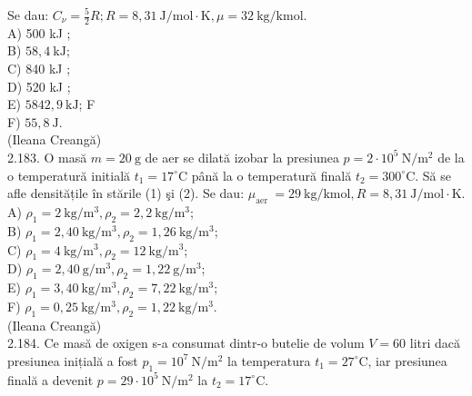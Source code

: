 \documentclass[10pt]{article}
\begin{document}
Se dau: $C_{\nu}=\frac{5}{2} R ; R=8,31 \mathrm{~J} / \mathrm{mol} \cdot \mathrm{K}, \mu=32 \mathrm{~kg} / \mathrm{kmol}$.\\
A) 500 kJ ;\\
B) $58,4 \mathrm{~kJ}$;\\
C) 840 kJ ;\\
D) 520 kJ ;\\
E) $5842,9 \mathrm{~kJ}$; F\\
F) $55,8 \mathrm{~J}$.\\
(Ileana Creangă)\\
2.183. O masă $m=20 \mathrm{~g}$ de aer se dilată izobar la presiunea $p=2 \cdot 10^{5} \mathrm{~N} / \mathrm{m}^{2}$ de la o temperatură initială $t_{1}=17^{\circ} \mathrm{C}$ până la o temperatură finală $t_{2}=300^{\circ} \mathrm{C}$. Să se afle densitățile în stările (1) şi (2). Se dau: $\mu_{\text {aer }}=29 \mathrm{~kg} / \mathrm{kmol}, R=8,31 \mathrm{~J} / \mathrm{mol} \cdot \mathrm{K}$.\\
A) $\rho_{1}=2 \mathrm{~kg} / \mathrm{m}^{3}, \rho_{2}=2,2 \mathrm{~kg} / \mathrm{m}^{3}$;\\
B) $\rho_{1}=2,40 \mathrm{~kg} / \mathrm{m}^{3}, \rho_{2}=1,26 \mathrm{~kg} / \mathrm{m}^{3}$;\\
C) $\rho_{1}=4 \mathrm{~kg} / \mathrm{m}^{3}, \rho_{2}=12 \mathrm{~kg} / \mathrm{m}^{3}$;\\
D) $\rho_{1}=2,40 \mathrm{~g} / \mathrm{m}^{3}, \rho_{2}=1,22 \mathrm{~g} / \mathrm{m}^{3}$;\\
E) $\rho_{1}=3,40 \mathrm{~kg} / \mathrm{m}^{3}, \rho_{2}=7,22 \mathrm{~kg} / \mathrm{m}^{3}$;\\
F) $\rho_{1}=0,25 \mathrm{~kg} / \mathrm{m}^{3}, \rho_{2}=1,22 \mathrm{~kg} / \mathrm{m}^{3}$.\\
(Ileana Creangă)\\
2.184. Ce masă de oxigen s-a consumat dintr-o butelie de volum $V=60$ litri dacă presiunea inițială a fost $p_{1}=10^{7} \mathrm{~N} / \mathrm{m}^{2}$ la temperatura $t_{1}=27^{\circ} \mathrm{C}$, iar presiunea finală a devenit $p=29 \cdot 10^{5} \mathrm{~N} / \mathrm{m}^{2}$ la $t_{2}=17^{\circ} \mathrm{C}$.
\end{document}
